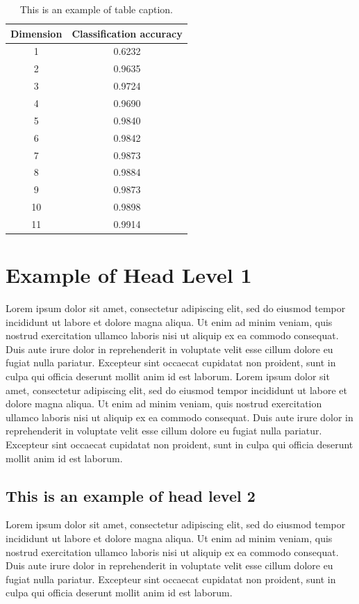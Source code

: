 \documentclass{sbc2025}%
\begin{document}
\begin{table}[!ht]
\caption{This is an example of table caption.}
\centering
\begin{tabular}{@{}cc@{}}
\hline\hline
Dimension & Classification accuracy \\
\hline%
 1  & 0.6232 \\
 2  & 0.9635 \\ 
 3  & 0.9724 \\ 
 4  & 0.9690 \\ 
 5  & 0.9840 \\ 
 6  & 0.9842 \\ 
 7  & 0.9873 \\ 
 8  & 0.9884 \\
 9  & 0.9873 \\ 
 10 & 0.9898 \\ 
 11 & 0.9914 \\
\hline\hline
\end{tabular}
\label{tab1}
\end{table}

 
\section{Example of Head Level 1}

Lorem ipsum dolor sit amet, consectetur adipiscing elit, sed do eiusmod tempor incididunt ut labore et dolore magna aliqua. Ut enim ad minim veniam, quis nostrud exercitation ullamco laboris nisi ut aliquip ex ea commodo consequat. Duis aute irure dolor in reprehenderit in voluptate velit esse cillum dolore eu fugiat nulla pariatur. Excepteur sint occaecat cupidatat non proident, sunt in culpa qui officia deserunt mollit anim id est laborum. Lorem ipsum dolor sit amet, consectetur adipiscing elit, sed do eiusmod tempor incididunt ut labore et dolore magna aliqua. Ut enim ad minim veniam, quis nostrud exercitation ullamco laboris nisi ut aliquip ex ea commodo consequat. Duis aute irure dolor in reprehenderit in voluptate velit esse cillum dolore eu fugiat nulla pariatur. Excepteur sint occaecat cupidatat non proident, sunt in culpa qui officia deserunt mollit anim id est laborum.

\subsection{This is an example of head level 2}
Lorem ipsum dolor sit amet, consectetur adipiscing elit, sed do eiusmod tempor incididunt ut labore et dolore magna aliqua. Ut enim ad minim veniam, quis nostrud exercitation ullamco laboris nisi ut aliquip ex ea commodo consequat. Duis aute irure dolor in reprehenderit in voluptate velit esse cillum dolore eu fugiat nulla pariatur. Excepteur sint occaecat cupidatat non proident, sunt in culpa qui officia deserunt mollit anim id est laborum.
\end{document}
